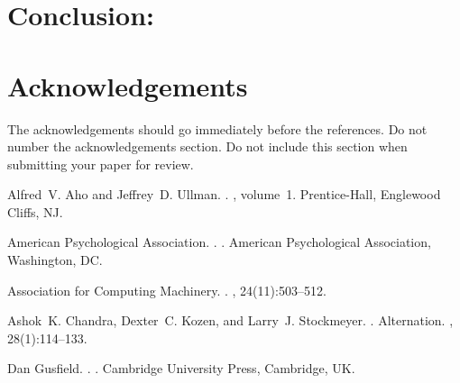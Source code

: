\documentclass[11pt]{article}
\begin{document}
\section{Conclusion:}





\section*{Acknowledgements}

The acknowledgements should go immediately before the references.  Do
not number the acknowledgements section. Do not include this section
when submitting your paper for review.

%
%

\begin{thebibliography}{}

Alfred~V. Aho and Jeffrey~D. Ullman.
.
, volume~1.
\newblock Prentice-{Hall}, Englewood Cliffs, NJ.

{American Psychological Association}.
.
.
\newblock American Psychological Association, Washington, DC.

{Association for Computing Machinery}.
.
, 24(11):503--512.

Ashok~K. Chandra, Dexter~C. Kozen, and Larry~J. Stockmeyer.
.
\newblock Alternation.
,
  28(1):114--133.

Dan Gusfield.
.
.
\newblock Cambridge University Press, Cambridge, UK.

\end{thebibliography}
\end{document}
